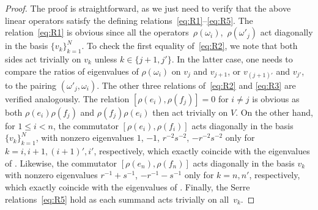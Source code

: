 \documentclass[pdftex]{sigma}
\numberwithin{equation}{section}
\begin{document}
\begin{proof}
The proof is straightforward, as we just need to verify that the above linear operators satisfy the defining relations~\eqref{eq:R1}--\eqref{eq:R5}. The relation~\eqref{eq:R1} is obvious since all the operators~$\rho(\omega_i)$,~$\rho(\omega'_j)$ act diagonally in the basis $\{v_k\}_{k=1}^N$. To check the first equality of~\eqref{eq:R2}, we note that both sides act trivially on $v_k$ unless $k\in \{j+1,j'\}$. In the latter case, one needs to compare the ratios of eigenvalues of $\rho(\omega_i)$ on
$v_{j}$ and $v_{j+1}$, or $v_{(j+1)'}$ and $v_{j'}$, to the pairing $(\omega'_j,\omega_i)$. The other three relations of~\eqref{eq:R2} and \eqref{eq:R3} are verified analogously. The relation $[\rho(e_i),\rho(f_j)]=0$ for $i\ne j$ is obvious as both $\rho(e_i)\rho(f_j)$ and $\rho(f_j)\rho(e_i)$ then act trivially on $V$. On the other hand, for $1\leq i<n$, the commutator $[\rho(e_i),\rho(f_i)]$ acts diagonally in the basis $\{v_k\}_{k=1}^N$, with nonzero eigenvalues $1$, $-1$, $r^{-2}s^{-2}$, $-r^{-2}s^{-2}$ only for $k=i,i+1,(i+1)',i'$, respectively, which exactly coincide with the eigenvalues of . Likewise, the commutator $[\rho(e_n),\rho(f_n)]$ acts diagonally in the basis $v_k$ with nonzero eigenvalues $r^{-1}+s^{-1}$, $-r^{-1}-s^{-1}$ only for $k=n,n'$, respectively, which exactly coincide with the eigenvalues of . Finally, the Serre relations~\eqref{eq:R5} hold as each summand acts trivially on all~$v_k$.
\end{proof}
\end{document}

